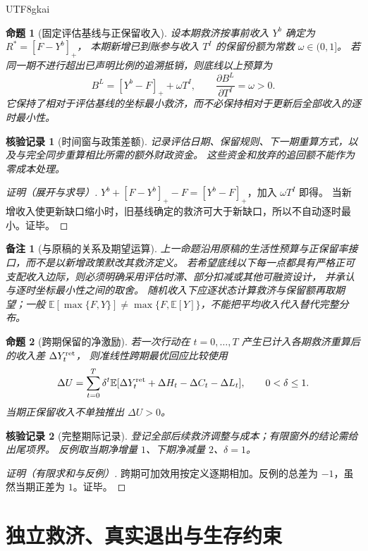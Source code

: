 \documentclass[12pt,a4paper,openany]{report}
\newtheorem{proposition}{命题}[chapter]
\newtheorem{remark}{备注}[chapter]
\newtheorem{Certificate}{核验记录}[chapter]
\newcommand{\EE}{\mathbb E}
\newcommand{\Original}{原稿}
\begin{document}
\begin{CJK*}{UTF8}{gkai}
\begin{proposition}[固定评估基线与正保留收入]
\label{prop:retention}
设本期救济按事前收入 $Y^b$ 确定为 $R^*=[F-Y^b]_+$，
本期新增已到账参与收入 $T^I$ 的保留份额为常数 $\omega\in(0,1]$。
若同一期不进行超出已声明比例的追溯抵销，则底线以上预算为
\[
 B^L=[Y^b-F]_++\omega T^I,\qquad
 \frac{\partial B^L}{\partial T^I}=\omega>0.
\]
它保持了相对于评估基线的坐标最小救济，而不必保持相对于更新后全部收入的逐时最小性。
\end{proposition}
\begin{Certificate}[时间窗与政策差额]
记录评估日期、保留规则、下一期重算方式，以及与完全同步重算相比所需的额外财政资金。
这些资金和放弃的追回额不能作为零成本处理。
\end{Certificate}
\begin{proof}[证明（展开与求导）]
$Y^b+[F-Y^b]_+-F=[Y^b-F]_+$，加入 $\omega T^I$ 即得。
当新增收入使更新缺口缩小时，旧基线确定的救济可大于新缺口，所以不自动逐时最小。证毕。
\end{proof}

\begin{remark}[与原稿的关系及期望运算]
上一命题沿用\Original 的生活性预算与正保留率接口，而不是以新增政策默改其救济定义。
若希望底线以下每一点都具有严格正可支配收入边际，则必须明确采用评估时滞、部分扣减或其他可融资设计，
并承认与逐时坐标最小性之间的取舍。
随机收入下应逐状态计算救济与保留额再取期望；一般
$\EE[\max\{F,Y\}]\ne\max\{F,\EE[Y]\}$，不能把平均收入代入替代完整分布。
\end{remark}

\begin{proposition}[跨期保留的净激励]
\label{prop:intertemporal-retention}
若一次行动在 $t=0,\ldots,T$ 产生已计入各期救济重算后的收入差 $\Delta Y_t^{\rm ret}$，
则准线性跨期最优回应比较使用
\[
 \Delta U=\sum_{t=0}^T\delta^t\EE[\Delta Y_t^{\rm ret}+\Delta H_t-\Delta C_t-\Delta L_t],
 \qquad 0<\delta\le1.
\]
当期正保留收入不单独推出 $\Delta U>0$。
\end{proposition}
\begin{Certificate}[完整期际记录]
登记全部后续救济调整与成本；有限窗外的结论需给出尾项界。
反例取当期净增量 $1$、下期净减量 $2$、$\delta=1$。
\end{Certificate}
\begin{proof}[证明（有限求和与反例）]
跨期可加效用按定义逐期相加。反例的总差为 $-1$，虽然当期正差为 $1$。证毕。
\end{proof}

\section{独立救济、真实退出与生存约束}


\end{CJK*}
\end{document}
